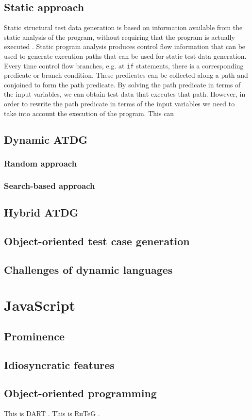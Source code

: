 \documentclass[a4paper,11pt,titlepage]{report}
\begin{document}
\subsection{Static approach}
Static structural test data generation is based on information available from the static analysis of the program, without requiring that the program is actually executed \cite{mcminn2004search}. Static program analysis produces control flow information that can be used to generate execution paths that can be used for static test data generation. Every time control flow branches, e.g. at \texttt{if} statements, there is a corresponding predicate or branch condition. These predicates can be collected along a path and conjoined to form the path predicate. By solving the path predicate in terms of the input variables, we can obtain test data that executes that path. However, in order to rewrite the path predicate in terms of the input variables we need to take into account the execution of the program. This can  


\subsection{Dynamic ATDG}
\subsubsection{Random approach}
\subsubsection{Search-based approach}

\subsection{Hybrid ATDG}

\subsection{Object-oriented test case generation}
\subsection{Challenges of dynamic languages}

\section{JavaScript}
\subsection{Prominence}
\subsection{Idiosyncratic features}
\subsection{Object-oriented programming}

This is DART \cite{godefroid2005dart}. This is RuTeG \cite{mairhofer2008search}.


\end{document}
